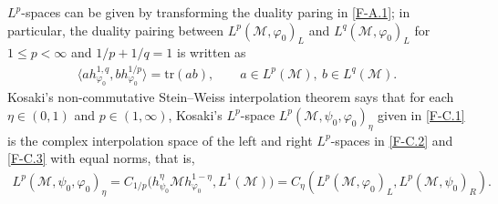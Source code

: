 \documentclass[12pt]{article}
\theoremstyle{definition}
\theoremstyle{remark}
\numberwithin{equation}{section}
\def\Me{\mathcal M}
\def\Tr{\mathrm{tr}}
\def\<{\langle}
\def\>{\rangle}
\def\ffi{\varphi}
\begin{document}
$L^p$-spaces can be given by transforming the duality paring in \eqref{F-A.1}; in particular,
the duality pairing between $L^p(\Me,\ffi_0)_L$ and $L^q(\Me,\ffi_0)_L$ for $1\le p<\infty$ and
$1/p+1/q=1$ is written as
\begin{align}\label{F-C.5}
\<ah_{\ffi_0}^{1,q},bh_{\ffi_0}^{1/p}\>=\Tr(ab),\qquad
a\in L^p(\Me),\ b\in L^q(\Me).
\end{align}
Kosaki's non-commutative Stein--Weiss interpolation theorem \cite[Theorem 11.1]{kosaki1984applications}
says that for each $\eta\in(0,1)$ and $p\in(1,\infty)$, Kosaki's $L^p$-space $L^p(\Me,\psi_0,\ffi_0)_\eta$
given in \eqref{F-C.1} is the complex interpolation space of the left and right $L^p$-spaces in \eqref{F-C.2}
and \eqref{F-C.3} with equal norms, that is,
\begin{align}\label{F-C.6}
L^p(\Me,\psi_0,\ffi_0)_\eta
=C_{1/p}\bigl(h_{\psi_0}^\eta\Me h_{\ffi_0}^{1-\eta},L^1(\Me)\bigr)
=C_\eta(L^p(\Me,\ffi_0)_L,L^p(\Me,\psi_0)_R).
\end{align}

%
%


\end{document}
